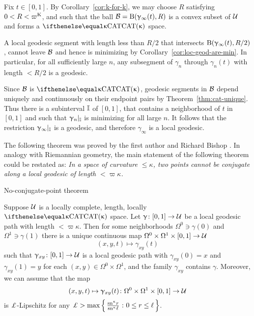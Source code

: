 Fix $t\in[0,1]$.
By Corollary~\ref{cor:k-for-k}, we may choose $R$ satisfying $0<R<\varpi\Kappa$,
and such that
the ball $\mathcal{B}=\mathrm{B}{}(\upgamma_\infty(t),R)$ is a convex subset of $\mathcal{U}$ and forms a $\CAT\kappa$ space.



A local geodesic segment  with length less than $R/2$ that intersects $\mathrm{B}{}(\upgamma_\infty(t),R/2)$, cannot leave $\mathcal{B}$ and hence  is  minimizing by Corollary~\ref{cor:loc-geod-are-min}.  In particular, for all sufficiently large $n$, any subsegment  of $\gamma_n$ through $\gamma_n(t)$  with length $<R/2$ is a geodesic.


Since $\mathcal{B}$ is $\CAT\kappa$, geodesic segments in $\mathcal{B}$ depend uniquely and continuously on their endpoint pairs by Theorem~\ref{thm:cat-unique}.  
Thus there is a subinterval $\mathbb{I}$ of $[0,1]$,
that contains a neighborhood of $t$ in $[0,1]$
and such that $\upgamma_n|_{\mathbb{I}}$ is minimizing for all large $n$.
It follows that the restriction $\upgamma_\infty|_{\mathbb{I}}$ is a geodesic,
and therefore $\gamma_\infty$ is a local geodesic.
\qeds


The following theorem was proved by the first author and Richard Bishop \cite{alexander-bishop:h-c}.
In analogy with Riemannian geometry, the main statement of the following theorem could be restated as: 
\emph{In a space of curvature $\le\kappa$, two points cannot be conjugate along a local geodesic of length $<\varpi\kappa$.}


\begin{thm}{No-conjugate-point theorem}
\label{thm:no-conj-pt}{\sloppy 
Suppose $\mathcal{U}$ is a locally complete, length, locally $\CAT\kappa$ space.
Let $\gamma\:[0,1]\to\spc{U}$ be a local geodesic path with length $<\varpi\kappa$.
Then for some neighborhoods $\Omega^0\ni \gamma(0)$ and $\Omega^1\ni\gamma(1)$ 
there is a unique continuous map $\Omega^0\times \Omega^1\times[0,1]\to\spc{U}$
\[(x,y,t)\mapsto\gamma_{x y}(t)\]
such that 
$\gamma_{x y}\:[0,1]\to\spc{U}$ is a local geodesic path with 
$\gamma_{x y}(0)=x$ and 
$\gamma_{x y}(1)=y$ for each $(x,y)\in\Omega^0\times\Omega^1$,
and the family $\gamma_{x y}$ contains $\gamma$.
Moreover, we can assume that the map 
\[(x,y,t)\mapsto\gamma_{x y}(t)\:\Omega^0\times\Omega^1\times[0,1]\to\spc{U}\] 
is $\Lip$-Lipschitz
for any
$\Lip>\max\set{\tfrac{\sn\kappa r}{\sn\kappa \ell}}{0\le r\le \ell}$.

}
\end{thm}

